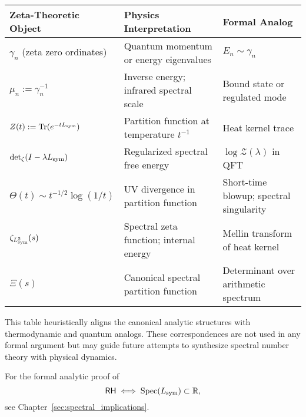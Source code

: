 \begin{center}
\small
\renewcommand{\arraystretch}{1.3}
\begin{tabularx}{\textwidth}{|X|X|X|}
\hline
\textbf{Zeta-Theoretic Object} & \textbf{Physics Interpretation} & \textbf{Formal Analog} \\
\hline
\( \gamma_n \) (zeta zero ordinates) &
Quantum momentum or energy eigenvalues &
\( E_n \sim \gamma_n \) \\
\( \mu_n := \gamma_n^{-1} \) &
Inverse energy; infrared spectral scale &
Bound state or regulated mode \\
\( Z(t) := \operatorname{Tr}(e^{-t L_{\mathrm{sym}}}) \) &
Partition function at temperature \( t^{-1} \) &
Heat kernel trace \\
\( \det\nolimits_{\zeta}(I - \lambda L_{\mathrm{sym}}) \) &
Regularized spectral free energy &
\( \log \mathcal{Z}(\lambda) \) in QFT \\
\( \Theta(t) \sim t^{-1/2} \log(1/t) \) &
UV divergence in partition function &
Short-time blowup; spectral singularity \\
\( \zeta_{L_{\mathrm{sym}}^2}(s) \) &
Spectral zeta function; internal energy &
Mellin transform of heat kernel \\
\( \Xi(s) \) &
Canonical spectral partition function &
Determinant over arithmetic spectrum \\
\hline
\end{tabularx}
\end{center}

\noindent
This table heuristically aligns the canonical analytic structures with thermodynamic and quantum analogs. These correspondences are not used in any formal argument but may guide future attempts to synthesize spectral number theory with physical dynamics.

\medskip
\noindent
For the formal analytic proof of
\[
\mathsf{RH} \iff \operatorname{Spec}(L_{\mathrm{sym}}) \subset \mathbb{R},
\]
see Chapter~\ref{sec:spectral_implications}.
